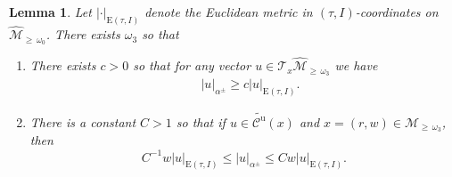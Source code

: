 \documentclass[10pt]{amsart}
\newtheorem{lemm}[theo]{Lemma}\newtheorem{prop}[theo]{Proposition}\newtheorem{coro}[theo]{Corollary}\newtheorem{conj}[theo]{Conjecture}
\theoremstyle{definition}\newtheorem{defi}[theo]{Definition}\newtheorem{rema}[theo]{Remark}\newtheorem{exam}[theo]{Example}\newtheorem{exem}[theo]{Example}\newtheorem{nota}[theo]{Notation}
\newcommand{\ct}{r}
\newcommand{\inv}{^{-1}}
\newcommand{\unstable}{\text{u}}
\newcommand{\tang}{\mathcal{T}}
\newcommand{\csp}{\mathcal{M}}
\newcommand{\cone}{\mathcal{C}}
\newcommand{\cspl}[1]{\csp_{\ge\,#1}}
\newcommand{\cspil}[1]{\widehat{\csp}_{\ge\,#1}}
\newcommand{\coneu}{\cone^\unstable}
\newcommand{\mconeu}{{\widetilde{\coneu}}}
\newcommand{\law}[1]{\omega_{#1}}
\newcommand{\admPm}{_{\alpha^{\pm}}}
\newcommand*{\relabel}{\renewcommand{\labelenumi}{(\theenumi)}}
\newcommand*{\alphenumi}{\renewcommand*{\theenumi}{\alph{enumi}}\relabel}
\begin{document}
\begin{lemm}\label{LmAlp-Euc}
Let $|\cdot|_{\text{E}(\tau,I)}$ denote the Euclidean metric in $(\tau,I)$-coordinates on $\cspil{\law0}$. There exists $\law3$ so that
\begin{enumerate}\alphenumi
\item\label{lemm4.18.1} There exists $c > 0$ so that for any vector $u\in\tang_{x}\cspil{\law3}$ we have
\begin{align}\label{e_boundAlphaTau}
\quad |u|\admPm \ge
c|u|_{\text{E}(\tau,I)}.
\end{align}
\item\label{lemm4.18.2} There is a constant $C\!>\! 1$ so that if $u\!\in\!\mconeu({x})$ and $x \!=\! (\ct,w)\in\cspl{\law3}$, then
\begin{equation}\label{e_boundAlphaTauCone}
C\inv w|u|_{\text{E}(\tau,I)}\leq |u|\admPm\leq C w|u|_{\text{E}(\tau,I)}.
\end{equation}
\end{enumerate}
\end{lemm}
\end{document}
